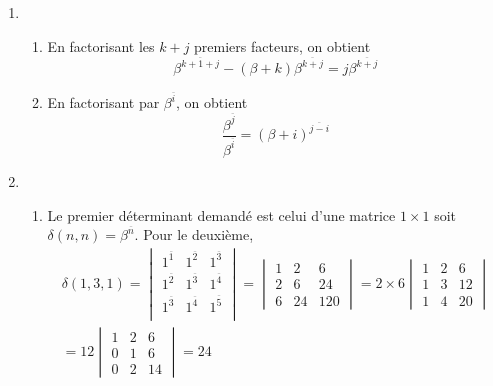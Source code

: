 \begin{enumerate}
 \item
\begin{enumerate}
 \item En factorisant les $k+j$ premiers facteurs, on obtient
\begin{displaymath}
 \beta^{\overline{k+1+j}}-(\beta +k)\beta^{\overline{k+j}}
= j\beta^{\overline{k+j}}
\end{displaymath}

 \item En factorisant par $\beta^{\overline{i}}$, on obtient 
\begin{displaymath}
 \frac{\beta^{\overline{j}}}{\beta^{\overline{i}}}= (\beta+i)^{\overline{j-i}}
\end{displaymath}

\end{enumerate}
 
 \item
\begin{enumerate}
 \item Le premier déterminant demandé est celui d'une matrice $1\times 1$ soit $\delta(n,n)= \beta ^{\overline{n}}$. Pour le deuxième,
\begin{multline*}
 \delta(1,3,1)=
\begin{vmatrix}
 1^{\overline{1}} &1^{\overline{2}} & 1^{\overline{3}} \\ 
1^{\overline{2}} &1^{\overline{3}} & 1^{\overline{4}} \\
1^{\overline{3}} &1^{\overline{4}} & 1^{\overline{5}} \\
\end{vmatrix}
= \begin{vmatrix}
1 & 2 & 6 \\ 2 & 6 & 24 \\ 6 & 24 & 120   
\end{vmatrix}
= 2\times 6 
\begin{vmatrix}
1 & 2 & 6 \\ 1 & 3 & 12 \\ 1 & 4 & 20   
\end{vmatrix} \\
=12 \begin{vmatrix}
1 & 2 & 6 \\ 0 & 1 & 6 \\ 0 & 2 & 14
\end{vmatrix}
= 24
\end{multline*}


\end{enumerate}
\end{enumerate}

